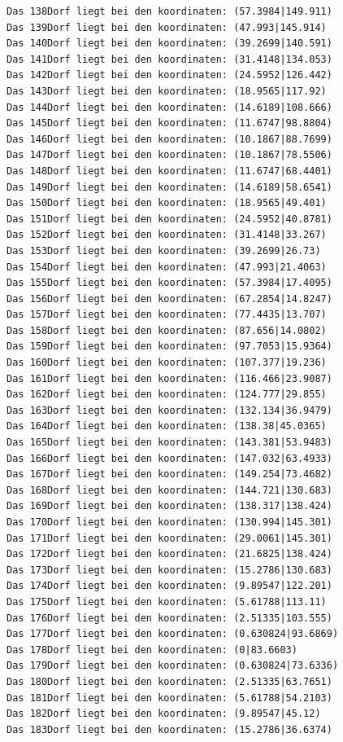\documentclass{article}
\begin{document}
\begin{verbatim}
Das 138Dorf liegt bei den koordinaten: (57.3984|149.911)
Das 139Dorf liegt bei den koordinaten: (47.993|145.914)
Das 140Dorf liegt bei den koordinaten: (39.2699|140.591)
Das 141Dorf liegt bei den koordinaten: (31.4148|134.053)
Das 142Dorf liegt bei den koordinaten: (24.5952|126.442)
Das 143Dorf liegt bei den koordinaten: (18.9565|117.92)
Das 144Dorf liegt bei den koordinaten: (14.6189|108.666)
Das 145Dorf liegt bei den koordinaten: (11.6747|98.8804)
Das 146Dorf liegt bei den koordinaten: (10.1867|88.7699)
Das 147Dorf liegt bei den koordinaten: (10.1867|78.5506)
Das 148Dorf liegt bei den koordinaten: (11.6747|68.4401)
Das 149Dorf liegt bei den koordinaten: (14.6189|58.6541)
Das 150Dorf liegt bei den koordinaten: (18.9565|49.401)
Das 151Dorf liegt bei den koordinaten: (24.5952|40.8781)
Das 152Dorf liegt bei den koordinaten: (31.4148|33.267)
Das 153Dorf liegt bei den koordinaten: (39.2699|26.73)
Das 154Dorf liegt bei den koordinaten: (47.993|21.4063)
Das 155Dorf liegt bei den koordinaten: (57.3984|17.4095)
Das 156Dorf liegt bei den koordinaten: (67.2854|14.8247)
Das 157Dorf liegt bei den koordinaten: (77.4435|13.707)
Das 158Dorf liegt bei den koordinaten: (87.656|14.0802)
Das 159Dorf liegt bei den koordinaten: (97.7053|15.9364)
Das 160Dorf liegt bei den koordinaten: (107.377|19.236)
Das 161Dorf liegt bei den koordinaten: (116.466|23.9087)
Das 162Dorf liegt bei den koordinaten: (124.777|29.855)
Das 163Dorf liegt bei den koordinaten: (132.134|36.9479)
Das 164Dorf liegt bei den koordinaten: (138.38|45.0365)
Das 165Dorf liegt bei den koordinaten: (143.381|53.9483)
Das 166Dorf liegt bei den koordinaten: (147.032|63.4933)
Das 167Dorf liegt bei den koordinaten: (149.254|73.4682)
Das 168Dorf liegt bei den koordinaten: (144.721|130.683)
Das 169Dorf liegt bei den koordinaten: (138.317|138.424)
Das 170Dorf liegt bei den koordinaten: (130.994|145.301)
Das 171Dorf liegt bei den koordinaten: (29.0061|145.301)
Das 172Dorf liegt bei den koordinaten: (21.6825|138.424)
Das 173Dorf liegt bei den koordinaten: (15.2786|130.683)
Das 174Dorf liegt bei den koordinaten: (9.89547|122.201)
Das 175Dorf liegt bei den koordinaten: (5.61788|113.11)
Das 176Dorf liegt bei den koordinaten: (2.51335|103.555)
Das 177Dorf liegt bei den koordinaten: (0.630824|93.6869)
Das 178Dorf liegt bei den koordinaten: (0|83.6603)
Das 179Dorf liegt bei den koordinaten: (0.630824|73.6336)
Das 180Dorf liegt bei den koordinaten: (2.51335|63.7651)
Das 181Dorf liegt bei den koordinaten: (5.61788|54.2103)
Das 182Dorf liegt bei den koordinaten: (9.89547|45.12)
Das 183Dorf liegt bei den koordinaten: (15.2786|36.6374)

\end{verbatim}
\end{document}
